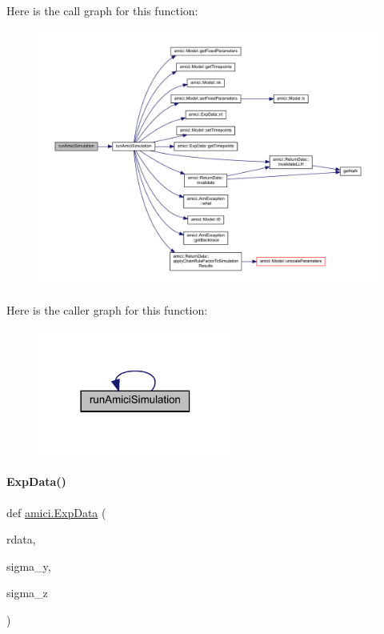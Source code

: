 Here is the call graph for this function\+:
\nopagebreak
\begin{figure}[H]
\begin{center}
\leavevmode
\includegraphics[width=350pt]{namespaceamici_a9501315e2c79e5787a62c57c05ffe7c0_cgraph}
\end{center}
\end{figure}
Here is the caller graph for this function\+:
\nopagebreak
\begin{figure}[H]
\begin{center}
\leavevmode
\includegraphics[width=182pt]{namespaceamici_a9501315e2c79e5787a62c57c05ffe7c0_icgraph}
\end{center}
\end{figure}
\mbox{\label{namespaceamici_a980cf029aff8cab806e35bdbdd3375f5}} 
\paragraph{\texorpdfstring{Exp\+Data()}{ExpData()}}
{\footnotesize\ttfamily def \mbox{\hyperlink{classamici_1_1_exp_data}{amici.\+Exp\+Data}} (\begin{DoxyParamCaption}\item[{}]{rdata,  }\item[{}]{sigma\+\_\+y,  }\item[{}]{sigma\+\_\+z }\end{DoxyParamCaption})}


